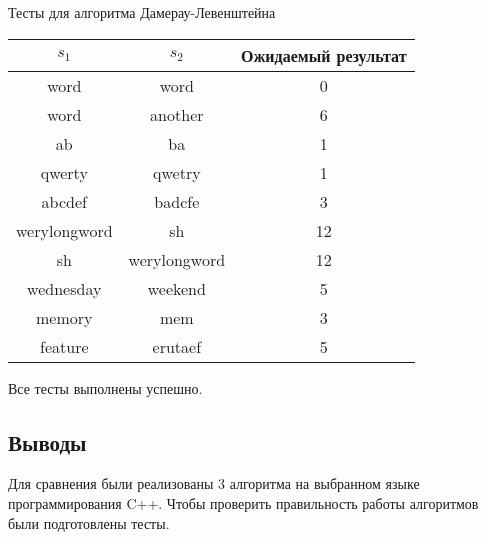 \begin{center}
    Тесты для алгоритма Дамерау-Левенштейна

    \begin{tabular}{|c|c|c|}
        \hline
        $s_1$ & $s_2$ & Ожидаемый результат \\
        \hline
        word & word & 0 \\
        \hline
        word & another & 6 \\
        \hline
        ab & ba & 1 \\
        \hline
        qwerty & qwetry & 1 \\
        \hline
        abcdef & badcfe & 3 \\
        \hline
        werylongword & sh & 12 \\
        \hline
        sh & werylongword & 12 \\
        \hline
        wednesday & weekend & 5 \\
        \hline
        memory & mem & 3 \\
        \hline
        feature & erutaef & 5 \\
        \hline
    \end{tabular}
\end{center}

Все тесты выполнены успешно.

\subsection{Выводы}

Для сравнения были реализованы 3 алгоритма на выбранном языке
программирования C++. Чтобы проверить правильность работы алгоритмов
были подготовлены тесты.

